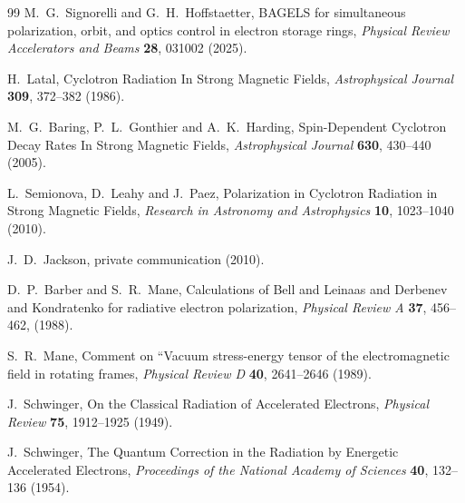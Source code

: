 \documentclass[review]{elsarticle}
\theoremstyle{plain}
\begin{document}
\begin{thebibliography}{99}
  M.~G.~Signorelli and G.~H.~Hoffstaetter, BAGELS for simultaneous polarization, orbit, and optics control in electron storage rings,
\textit{Physical Review Accelerators and Beams} {\bf 28}, 031002 (2025).

H.~Latal, Cyclotron Radiation In Strong Magnetic Fields,
\textit{Astrophysical Journal} {\bf 309}, 372--382 (1986).

M.~G.~Baring, P.~L.~Gonthier and A.~K.~Harding, Spin-Dependent Cyclotron Decay Rates In Strong Magnetic Fields,
\textit{Astrophysical Journal} {\bf 630}, 430--440 (2005).

L.~Semionova, D.~Leahy and J.~Paez, Polarization in Cyclotron Radiation in Strong Magnetic Fields,
\textit{Research in Astronomy and Astrophysics} {\bf 10}, 1023--1040 (2010).

J.~D.~Jackson, private communication (2010).

D.~P.~Barber and S.~R.~Mane, Calculations of Bell and Leinaas and Derbenev and Kondratenko for radiative electron polarization,
\textit{Physical Review A} {\bf 37}, 456--462, (1988).

S.~R.~Mane, Comment on ``Vacuum stress-energy tensor of the electromagnetic field in rotating frames,
\textit{Physical Review D} {\bf 40}, 2641--2646 (1989).

J.~Schwinger, On the Classical Radiation of Accelerated Electrons,
\textit{Physical Review} {\bf 75}, 1912--1925 (1949).

J.~Schwinger, The Quantum Correction in the Radiation by Energetic Accelerated Electrons,
\textit{Proceedings of the National Academy of Sciences} {\bf 40}, 132--136 (1954).

\end{thebibliography}
\end{document}
